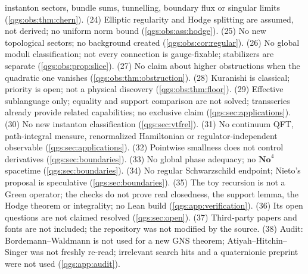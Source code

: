 \documentclass[11pt,oneside]{article}
\numberwithin{equation}{section}
\theoremstyle{plain}
\theoremstyle{definition}
\theoremstyle{remark}
\newcommand{\No}{\mathbf{No}}
\begin{document}
instanton sectors, bundle sums, tunnelling, boundary flux or singular limits (\cref{qgs:obs:thm:chern}). (24) Elliptic regularity and Hodge splitting are assumed, not derived; no uniform norm bound (\cref{qgs:obs:ass:hodge}). (25) No new topological sectors; no background created (\cref{qgs:obs:cor:regular}). (26) No global moduli classification; not every connection is gauge-fixable; stabilizers are separate (\cref{qgs:obs:prop:slice}). (27) No claim about higher obstructions when the quadratic one vanishes (\cref{qgs:obs:thm:obstruction}). (28) Kuranishi is classical; priority is open; not a physical discovery (\cref{qgs:obs:thm:floor}). (29) Effective sublanguage only; equality and support comparison are not solved; transseries already provide related capabilities; no exclusive claim (\cref{qgs:sec:applications}). (30) No new instanton classification (\cref{qgs:sec:vtfrel}). (31) No continuum QFT, path-integral measure, renormalized Hamiltonian or regulator-independent observable (\cref{qgs:sec:applications}). (32) Pointwise smallness does not control derivatives (\cref{qgs:sec:boundaries}). (33) No global phase adequacy; no $\No^4$ spacetime (\cref{qgs:sec:boundaries}). (34) No regular Schwarzschild endpoint; Nieto's proposal is speculative (\cref{qgs:sec:boundaries}). (35) The toy recursion is not a Green operator; the checks do not prove real closedness, the support lemma, the Hodge theorem or integrality; no Lean build (\cref{qgs:app:verification}). (36) Its open questions are not claimed resolved (\cref{qgs:sec:open}). (37) Third-party papers and fonts are not included; the repository was not modified by the source. (38) Audit: Bordemann--Waldmann is not used for a new GNS theorem; Atiyah--Hitchin--Singer was not freshly re-read; irrelevant search hits and a quaternionic preprint were not used (\cref{qgs:app:audit}).
\end{document}
